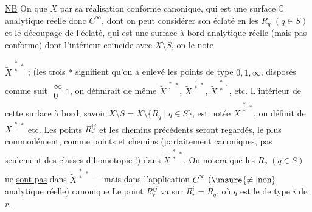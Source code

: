 \uline{NB} On  que $X$    par sa réalisation conforme canonique, qui est une surface $\mathbb{C}$ analytique réelle donc $C^\infty$, dont on peut considérer son éclaté en les $R_q$ $(q\in S)$ et le découpage de l'éclaté, qui est une surface à bord analytique réelle (mais pas conforme) dont l'intérieur coïncide avec $X\setminus S$, on le note



$\widetilde{X}^{\substack{*\\*}*}$ ; (les trois $*$ signifient qu'on a enlevé  les points de type $0,1,\infty$, disposés comme suit $\substack{\infty\\0}1$, on définirait de même $\widetilde{X}^{\substack{*\\\cdot}*}$, $\widetilde{X}^{\substack{\cdot\\*}*}$, $\widetilde{X}^{\substack{*\\*}\cdot}$, etc.  L'intérieur de cette surface à bord, savoir $X\setminus S=X\setminus\{R_q\mid q\in S\}$, est notée $X^{\substack{*\\*}*}$, on définit de \unsure{=} $X^{\substack{*\\\cdot}*}$ etc. Les points $R_r^{ij}$ et les chemins précédents seront regardés, le plus commodément, comme points et chemins (parfaitement canoniques, pas seulement des classes d'homotopie !) dans $\widetilde{X}^{\substack{*\\*}*}$. On notera que les $R_q$ $(q\in S)$ ne \uline{sont pas} dans $\widetilde{X}^{\substack{*\\*}*}$ --- mais dans l'application $C^\infty$ ($\unsure{\ne|\text{non}}$ analytique réelle) canonique
Le point $R_r^{ij}$ va sur $R_r^i=R_q$, où $q$ est le  de type $i$ de $r$.

